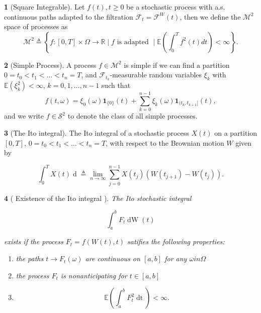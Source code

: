 \documentclass[british]{amsart} \usepackage{lmodern}
\numberwithin{equation}{section} \numberwithin{figure}{section}
\theoremstyle{plain} \newtheorem{thm}{\protect\theoremname}[section]
\theoremstyle{definition} \newtheorem{defn}[thm]{\protect\definitionname}
\theoremstyle{plain} \newtheorem{assumption}[thm]{\protect\assumptionname}
\theoremstyle{plain} \newtheorem{lem}[thm]{\protect\lemmaname}
\theoremstyle{plain} \newtheorem{prop}[thm]{\protect\propositionname}
\theoremstyle{remark} \newtheorem{rem}[thm]{\protect\remarkname}
\theoremstyle{plain} \newtheorem{cor}[thm]{\protect\corollaryname}
\renewcommand{\d}[1]{\mathop{\mathrm{d}{#1}}}
\newcommand{\defeq}{\mathop{\triangleq}} \newcommand{\almostsurely}{\text{a.s.}}
\begin{document}
\begin{defn} [Square Integrable]
  Let $f(t),t\ge0$ be a stochastic process with a.s. continuous paths
  adapted to the filtration $\mathcal{F}_{t}=\mathcal{F}^{W}(t)$, then
  we define the $\mathcal{M}^{2}$ space of processes as
  \begin{equation} 
    \mathcal{M}^{2} \defeq 
        \left\{
          f : [0,T] \times \Omega \to \mathbb{R} \mid
          f \text{ is adapted } \mid
          \mathbb{E} \left( \int_{0}^{T} f^{2}(t) dt \right) < \infty
        \right\}.
  \end{equation}
\end{defn}

\begin{defn} [Simple Process]
  A process $f\in\mathcal{M}^{2}$ is simple if we can find
  a partition $0=t_{0}<t_{1}<...<t_{n}=T$, and $\mathcal{F}_{t_{k}}$-measurable
  random variables $\xi_{k}$ with $\mathbb{E}(\xi_{k}^{2})<\infty$,
  $k=0,1,...,n-1$ such that
  \begin{equation}
    f(t,\omega)=\xi_{0}(\omega)\mathbf{1}_{\{0\}}(t)+\sum_{k=0}^{n-1}\xi_{k}(\omega)\mathbf{1}_{(t_{k},t_{k+1}]}(t),
  \end{equation}
 and we write $f\in\mathcal{S}^{2}$ to denote the class of all simple processes.
\end{defn}

\begin{defn} [The Ito integral]
  The Ito integral of a stochastic process $X(t)$ on a partition
  $[0,T]$, $0=t_{0}<t_{1}<\ldots<t_{n}=T$, with respect to the Brownian
  motion $W$ given by

  \begin{equation}
    \int_{0}^{T}X(t)\d{W(t)}\triangleq\lim_{n\to\infty}\sum_{j=0}^{n-1}X(t_{j})\left(W(t_{j+1})-W(t_{j})\right).
  \end{equation}

\end{defn}

\begin{prop} 
  [
    {\cite{shreve1991}}
    Existence of the Ito integral
  ]
  
  The Ito stochastic integral 
  
  \begin{equation*}
    \int_{a}^{b} F_t \d{W}(t)
  \end{equation*}

  exists if the process $F_t = f(W(t),t)$ satifies the following properties:

  \begin{enumerate}
    \item the paths $t \to F_t(\omega)$ are continuous on $[a,b]$ for any $\omega in \Omega$
    \item the process $F_t$ is nonanticipating for $t \in [a,b]$
    \item 
      \begin{equation*}
        \mathbb{E} \left( \int_{a}^{b} F^{2}_{t} \d{t} \right) < \infty.
      \end{equation*}
  \end{enumerate}
\end{prop}
\end{document}
